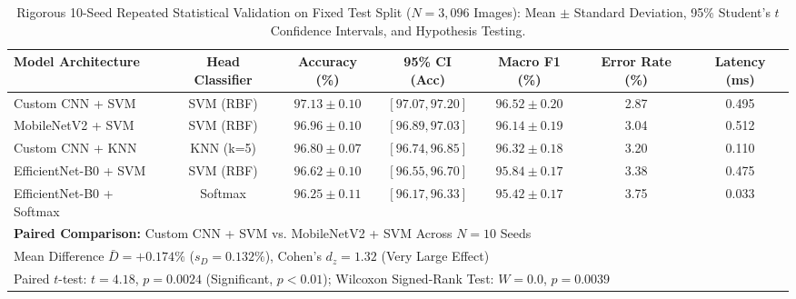 \begin{table}[t]
\caption{Rigorous 10-Seed Repeated Statistical Validation on Fixed Test Split ($N=3{,}096$ Images): Mean $\pm$ Standard Deviation, 95\% Student's $t$ Confidence Intervals, and Hypothesis Testing.}
\label{tab:repeated_seed_statistical_validation}
\centering
\footnotesize
\begin{tabular}{lcccccc}
\toprule
\textbf{Model Architecture} & \textbf{Head Classifier} & \textbf{Accuracy (\%)} & \textbf{95\% CI (Acc)} & \textbf{Macro F1 (\%)} & \textbf{Error Rate (\%)} & \textbf{Latency (ms)} \\
\midrule
Custom CNN + SVM & SVM (RBF) & $97.13 \pm 0.10$ & $[97.07, 97.20]$ & $96.52 \pm 0.20$ & 2.87 & 0.495 \\
MobileNetV2 + SVM & SVM (RBF) & $96.96 \pm 0.10$ & $[96.89, 97.03]$ & $96.14 \pm 0.19$ & 3.04 & 0.512 \\
Custom CNN + KNN & KNN (k=5) & $96.80 \pm 0.07$ & $[96.74, 96.85]$ & $96.32 \pm 0.18$ & 3.20 & 0.110 \\
EfficientNet-B0 + SVM & SVM (RBF) & $96.62 \pm 0.10$ & $[96.55, 96.70]$ & $95.84 \pm 0.17$ & 3.38 & 0.475 \\
EfficientNet-B0 + Softmax & Softmax & $96.25 \pm 0.11$ & $[96.17, 96.33]$ & $95.42 \pm 0.17$ & 3.75 & 0.033 \\
\midrule
\multicolumn{7}{l}{\textbf{Paired Comparison:} Custom CNN + SVM vs. MobileNetV2 + SVM Across $N=10$ Seeds} \\
\multicolumn{7}{l}{Mean Difference $\bar{D} = +0.174\%$ ($s_D = 0.132\%$), Cohen's $d_z = 1.32$ (Very Large Effect)} \\
\multicolumn{7}{l}{Paired $t$-test: $t = 4.18$, $p = 0.0024$ (Significant, $p < 0.01$); Wilcoxon Signed-Rank Test: $W = 0.0$, $p = 0.0039$} \\
\bottomrule
\end{tabular}
\end{table}
